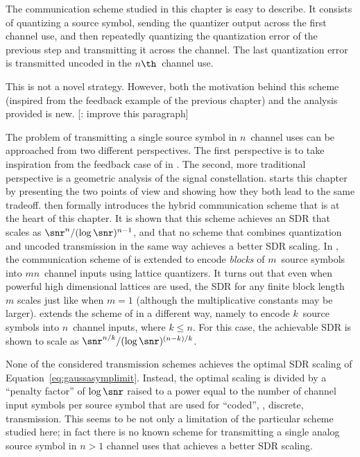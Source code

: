 The communication scheme studied in this chapter is easy to describe. It
consists of quantizing a source symbol, sending the quantizer output across the
first channel use, and then repeatedly quantizing the quantization error of the
previous step and transmitting it across the channel. The last quantization
error is transmitted uncoded in the $n\th$~channel use. 

This is not a novel strategy. However, both the motivation behind this scheme
(inspired from the feedback example of the previous chapter) and the analysis
provided is new. [\todo: improve this paragraph] 

The problem of transmitting a single source symbol in $n$~channel uses can be
approached from two different perspectives. The first perspective is to take
inspiration from the feedback case of  in .
The second, more traditional perspective is a geometric analysis of the signal
constellation.   starts this chapter by presenting the
two points of view and showing how they both lead to the same tradeoff.
 then formally introduces the hybrid communication scheme
that is at the heart of this chapter. It is shown that this scheme achieves an
SDR that scales as $\snr^n / (\log\snr)^{n-1}$, and that no scheme that combines
quantization and uncoded transmission in the same way achieves a better SDR
scaling. In , the communication scheme of
 is extended to encode \emph{blocks} of $m$~source symbols
into $mn$~channel inputs using lattice quantizers. It turns out that even when
powerful high dimensional lattices are used, the SDR for any finite
block length~$m$ scales just like when $m = 1$ (although the multiplicative
constants may be larger).  extends the scheme of
 in a different way, namely to encode $k$~source symbols
into $n$~channel inputs, where $k \le n$. For this case, the achievable SDR is
shown to scale as $\snr^{n/k} /(\log\snr)^{(n-k)/k}$. 

None of the considered transmission schemes achieves the optimal SDR scaling of
Equation~\ref{eq:gaussasymplimit}. Instead, the optimal scaling is divided by a
``penalty factor'' of $\log\snr$ raised to a power equal to the number of
channel input symbols per source symbol that are used for ``coded'', \ie,
discrete, transmission. This seems to be not only a limitation of the particular
scheme studied here; in fact there is no known scheme for transmitting a
single analog source symbol in $n > 1$ channel uses that achieves a better SDR
scaling. 

